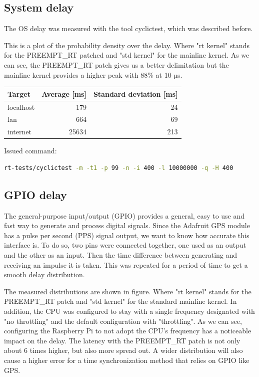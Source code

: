 \subsection{System delay}

The OS delay was measured with the tool cyclictest, which was described before.


This is a plot of the probability density over the delay. Where "rt kernel" stands for the PREEMPT\_RT patched and "std kernel" for the mainline kernel.
As we can see, the PREEMPT\_RT patch gives us a better delimitation but the mainline kernel provides a higher peak with 88\% at 10 µs.

\begin{center}
    \begin{tabular}{ | l | r | r | }
    \hline
    \textbf{Target} & \textbf{Average} [ms] & \textbf{Standard deviation} [ms] \\ \hline
    localhost & 179 & 24 \\ \hline
    lan & 664 & 69 \\ \hline
    internet & 25634 & 213 \\ \hline
    \end{tabular}
\end{center}

Issued command:

\begin{lstlisting}[language=bash]
rt-tests/cyclictest -m -t1 -p 99 -n -i 400 -l 10000000 -q -H 400
\end{lstlisting}

\subsection{GPIO delay}

The general-purpose input/output (GPIO) provides a general, easy to use and fast way to generate and process digital signals. Since the Adafruit GPS module has a pulse per second (PPS) signal output, we want to know how accurate this interface is.
To do so, two pins were connected together, one used as an output and the other as an input. Then the time difference between generating and receiving an impulse it is taken. This was repeated for a period of time to get a smooth delay distribution.


The measured distributions are shown in figure. Where "rt kernel" stands for the PREEMPT\_RT patch and "std kernel" for the standard mainline kernel. In addition, the CPU was configured to stay with a single frequency designated with "no throttling" and the default configuration with "throttling".
As we can see, configuring the Raspberry Pi to not adopt the CPU’s frequency has a noticeable impact on the delay. The latency with the PREEMPT\_RT patch is not only about 6 times higher, but also more spread out. A wider distribution will also cause a higher error for a time synchronization method that relies on GPIO like GPS.


